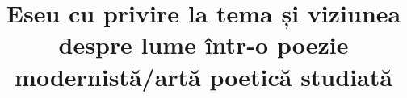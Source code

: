 

\title{Eseu cu privire la tema și viziunea despre lume într-o poezie modernistă/artă poetică studiată}


 \maketitle %
 

